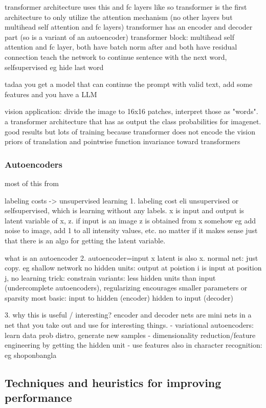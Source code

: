 \documentclass{article}
\begin{document}
transformer architecture uses this and fc layers like so
transformer is the first architecture to only utilize the attention mechanism (no other layers but multihead self attention and fc layers)
transformer has an encoder and decoder part (so is a variant of an autoencoder)
transformer block: multihead self attention and fc layer, both have batch norm after and both have residual connection
teach the network to continue sentence with the next word, selfsupervised eg hide last word

tadaa you get a model that can continue the prompt with valid text, add some features and you have a LLM

vision application: divide the image to 16x16 patches, interpret those as "words". a transformer architecture that has as output the class probabilities for imagenet. good results but lots of training because transformer does not encode the vision priors of translation and pointwise function invariance toward transformers

\subsubsection{Autoencoders}

most of this from \cite{goodfellow}

labeling costs -> unsupervised learning
1. labeling cost eli unsupervised or selfsupervised, which is learning without any labels.
 x is input and output is latent variable of x, z. if input is an image z is obtained from x somehow 
 eg add noise to image, add 1 to all intensity values, etc. no matter if it makes sense just that 
 there is an algo for getting the latent variable.

what is an autoencoder
2. autoencoder=input x latent is also x.
	normal net: just copy. eg shallow network no hidden units: output at poistion i is input at position j, no learning
	trick: constrain
		variants: less hidden units than input (undercomplete autoencoders), regularizing encourages smaller parameters or sparsity
	most basic: input to hidden (encoder) hidden to input (decoder)
		
3. why this is useful / interesting?
encoder and decoder nets are mini nets in a net that you take out and use for interesting things.
- variational autoencoders: learn data prob distro, generate new samples
- dimensionality reduction/feature engineering by getting the hidden unit
	- use features also in character recognition: eg shoponbangla

\subsection{Techniques and heuristics for improving performance}
\end{document}
